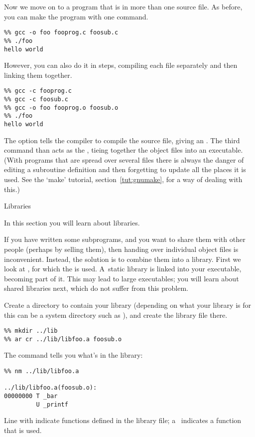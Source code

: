 Now we move on to a program that is in more than one source file.
As before, you can make the program with one command.
\begin{verbatim}
%% gcc -o foo fooprog.c foosub.c 
%% ./foo
hello world
\end{verbatim}
However, you can also do it in steps, compiling each file separately
and then linking them together.
\begin{verbatim}
%% gcc -c fooprog.c
%% gcc -c foosub.c
%% gcc -o foo fooprog.o foosub.o
%% ./foo
hello world
\end{verbatim}
The  option tells the compiler to compile the source file,
giving an . The third command than acts as the
, tieing together the object files into an
executable. (With programs that are spread over several files there is
always the danger of editing a subroutine definition and then
forgetting to update all the places it is used. See the `make'
tutorial, section~\ref{tut:gnumake}, for a way of dealing with this.) 

 {Libraries}

\begin{purpose}
  In this section you will learn about libraries.
\end{purpose}

If you have written some subprograms, and you want to share them with
other people (perhaps by selling them), then handing over individual
object files is inconvenient. Instead, the solution is to combine them
into a library. First we look at , for
which the   is used. A~static library
is linked into your executable, becoming part of it. This may lead to
large executables; you will learn about shared libraries
next, which do not suffer from this problem.

Create a directory to contain your library (depending on what your
library is for this can be a
system directory such as ), and create the library file
there. 
\begin{verbatim}
%% mkdir ../lib
%% ar cr ../lib/libfoo.a foosub.o
\end{verbatim}
The  command tells you what's in the library:
\begin{verbatim}
%% nm ../lib/libfoo.a 

../lib/libfoo.a(foosub.o):
00000000 T _bar
         U _printf
\end{verbatim}
Line with  indicate functions defined in the library file;
a~ indicates a function that is used.

